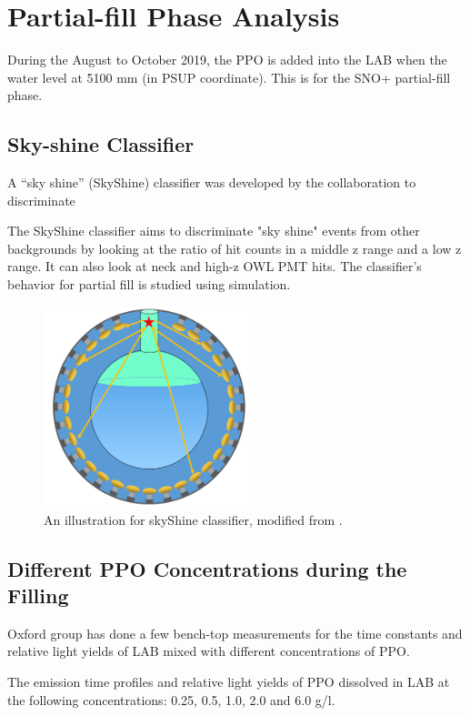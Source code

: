 \section{Partial-fill Phase Analysis}


During the August to October 2019, the PPO is added into the LAB when the water level at 5100 mm (in PSUP coordinate). This is for the SNO+ partial-fill phase.


\subsection{Sky-shine Classifier}
A ``sky shine'' (SkyShine) classifier was developed by the collaboration to discriminate 


The SkyShine classifier aims to discriminate "sky shine" events from other backgrounds by looking at the ratio of hit counts in a middle z range and a low z range. It can also look at neck and high-z OWL PMT hits. The classifier's behavior for partial fill is studied using simulation.

\cite{skyshine}


\begin{figure}[!htb]
	\centering
	\includegraphics[width=6cm]{skyShine.png}
\caption{ An illustration for skyShine classifier, modified from \cite{skyshine}.}
	\label{drivecor}
\end{figure}

\subsection{Different PPO Concentrations during the Filling}

Oxford group has done a few bench-top measurements for the time constants and relative light yields of LAB mixed with different concentrations of PPO\cite{oxfordMeasurement}.

The emission time profiles and relative light yields of PPO dissolved in LAB at the following concentrations: 0.25, 0.5, 1.0, 2.0 and 6.0 g/l.

